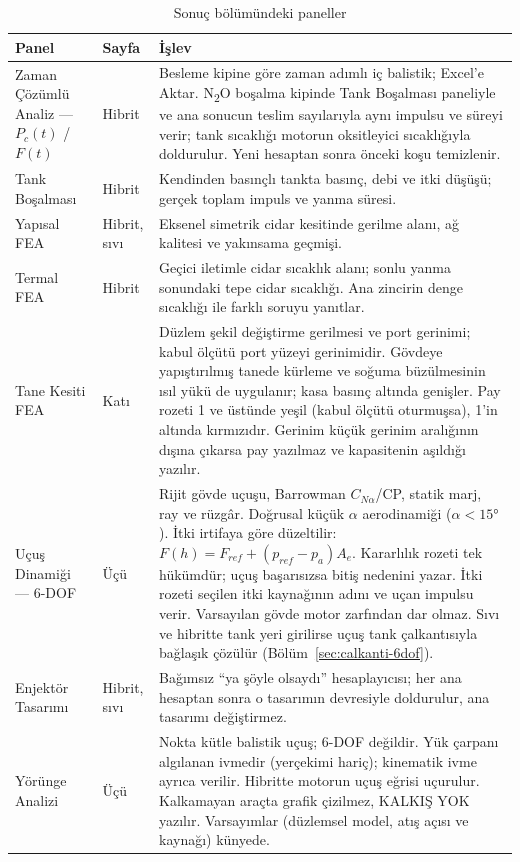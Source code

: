 \documentclass[11pt,a4paper]{article}
\newcommand{\ui}[1]{\textsf{#1}}
\begin{document}
\begin{table}[htbp]
\centering\small
\caption{Sonuç bölümündeki paneller}\label{tab:yanpanel}
\begin{tabular}{@{}>{\raggedright\arraybackslash}p{3.8cm}>{\raggedright\arraybackslash}p{2.0cm}>{\raggedright\arraybackslash}p{9.8cm}@{}}
\toprule
\textbf{Panel} & \textbf{Sayfa} & \textbf{İşlev} \\
\midrule
Zaman Çözümlü Analiz --- $P_c(t)$ / $F(t)$ & Hibrit & Besleme kipine göre zaman adımlı iç balistik; \ui{Excel'e Aktar}. N\textsubscript{2}O boşalma kipinde \ui{Tank Boşalması} paneliyle ve ana sonucun teslim sayılarıyla aynı impulsu ve süreyi verir; tank sıcaklığı motorun oksitleyici sıcaklığıyla doldurulur. Yeni hesaptan sonra önceki koşu temizlenir. \\
Tank Boşalması & Hibrit & Kendinden basınçlı tankta basınç, debi ve itki düşüşü; gerçek toplam impuls ve yanma süresi. \\
Yapısal FEA & Hibrit, sıvı & Eksenel simetrik cidar kesitinde gerilme alanı, ağ kalitesi ve yakınsama geçmişi. \\
Termal FEA & Hibrit & Geçici iletimle cidar sıcaklık alanı; sonlu yanma sonundaki tepe cidar sıcaklığı. Ana zincirin denge sıcaklığı ile farklı soruyu yanıtlar. \\
Tane Kesiti FEA & Katı & Düzlem şekil değiştirme gerilmesi ve port gerinimi; kabul ölçütü port yüzeyi gerinimidir. Gövdeye yapıştırılmış tanede kürleme ve soğuma büzülmesinin ısıl yükü de uygulanır; kasa basınç altında genişler. Pay rozeti 1 ve üstünde yeşil (kabul ölçütü oturmuşsa), 1'in altında kırmızıdır. Gerinim küçük gerinim aralığının dışına çıkarsa pay yazılmaz ve kapasitenin aşıldığı yazılır. \\
Uçuş Dinamiği --- 6-DOF & Üçü & Rijit gövde uçuşu, Barrowman $C_{N\alpha}$/CP, statik marj, ray ve rüzgâr. Doğrusal küçük $\alpha$ aerodinamiği ($\alpha < 15°$). İtki irtifaya göre düzeltilir: $F(h) = F_{ref} + (p_{ref} - p_a)A_e$. Kararlılık rozeti tek hükümdür; uçuş başarısızsa bitiş nedenini yazar. İtki rozeti seçilen itki kaynağının adını ve uçan impulsu verir. Varsayılan gövde motor zarfından dar olmaz. Sıvı ve hibritte tank yeri girilirse uçuş tank çalkantısıyla bağlaşık çözülür (Bölüm~\ref{sec:calkanti-6dof}). \\
Enjektör Tasarımı & Hibrit, sıvı & Bağımsız ``ya şöyle olsaydı'' hesaplayıcısı; her ana hesaptan sonra o tasarımın devresiyle doldurulur, ana tasarımı değiştirmez. \\
Yörünge Analizi & Üçü & Nokta kütle balistik uçuş; 6-DOF değildir. Yük çarpanı algılanan ivmedir (yerçekimi hariç); kinematik ivme ayrıca verilir. Hibritte motorun uçuş eğrisi uçurulur. Kalkamayan araçta grafik çizilmez, \ui{KALKIŞ YOK} yazılır. Varsayımlar (düzlemsel model, atış açısı ve kaynağı) künyede. \\
\bottomrule
\end{tabular}
\end{table}
\end{document}
